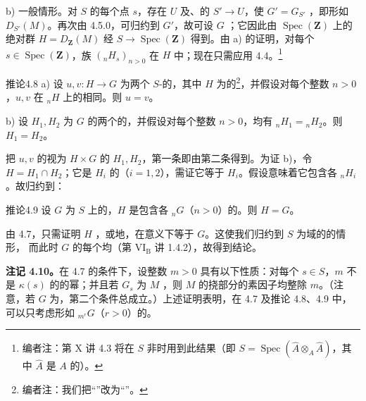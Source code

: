 b) 一般情形。对 $S$ 的每个点 $s$，存在 $U$ 及、的 $S'\to U$，使 $G'=G_{S'}$ ，即形如 $D_{S'}(M)$。再次由 4.5.0，可归约到 $G'$，故可设 $G$ ；它因此由 $\operatorname{Spec}(\mathbf Z)$ 上的绝对群 $H=D_{\mathbf Z}(M)$ 经 $S\to\operatorname{Spec}(\mathbf Z)$ 得到。由 a) 的证明，对每个 $s\in\operatorname{Spec}(\mathbf Z)$，族 $({}_nH_s)_{n>0}$ 在 $H$ 中；现在只需应用 4.4。\footnote{编者注：第 X 讲 4.3 将在 $S$ 非时用到此结果（即 $S=\operatorname{Spec}(\widehat A\otimes_A\widehat A)$，其中 $\widehat A$ 是 $A$ 的）。}
\begin{SGAresult}{推论}{4.8}
 a) 设 $u,v:H\to G$ 为两个 $S$-的，其中 $H$ 为的\footnote{编者注：我们把“”改为“”。}，并假设对每个整数 $n>0$，$u,v$ 在 ${}_nH$ 上的相同。则 $u=v$。

 b) 设 $H_1,H_2$ 为 $G$ 的两个的，并假设对每个整数 $n>0$，均有 ${}_nH_1={}_nH_2$。则 $H_1=H_2$。
\end{SGAresult}
把 $u,v$ 的视为 $H\times G$ 的 $H_1,H_2$，第一条即由第二条得到。为证 b)，令 $H=H_1\cap H_2$；它是 $H_i$ 的（$i=1,2$），需证它等于 $H_i$。假设意味着它包含各 ${}_nH_i$。故归约到：
\begin{SGAresult}{推论}{4.9}
设 $G$ 为 $S$ 上的，$H$ 是包含各 ${}_nG$（$n>0$）的。则 $H=G$。
\end{SGAresult}
由 4.7，只需证明 $H$ ，或地，在意义下等于 $G$。这使我们归约到 $S$ 为域的的情形，
而此时 $G$ 的每个均（第 VI$_{\mathrm B}$ 讲 1.4.2），故得到结论。

\textbf{注记 4.10。}在 4.7 的条件下，设整数 $m>0$ 具有以下性质：对每个 $s\in S$，$m$ 不是 $\kappa(s)$ 的的幂；并且若 $G_s$ 为 $M$ ，则 $M$ 的挠部分的素因子均整除 $m$。（注意，若 $G$ 为，第二个条件总成立。）上述证明表明，在 4.7 及推论 4.8、4.9 中，可以只考虑形如 ${}_{m^r}G$（$r>0$）的。

